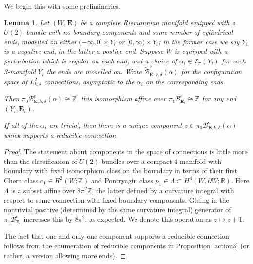 \documentclass{memo-l}
\newtheorem{lemma}[theorem]{Lemma}
\theoremstyle{definition}
\theoremstyle{remark}
\numberwithin{section}{chapter}
\numberwithin{equation}{chapter}
\begin{document}
We begin this with some preliminaries.

\begin{lemma}Let $(W,\mathbf{E})$ be a complete Riemannian manifold equipped with a $U(2)$-bundle with no boundary components and some number of cylindrical ends, modelled on either $(-\infty, 0] \times Y_i$ or $[0, \infty) \times Y_i$; in the former case we say $Y_i$ is a negative end, in the latter a postive end. Suppose $W$ is equipped with a perturbation which is regular on each end, and a choice of $\alpha_i \in \mathfrak C_\pi(Y_i)$ for each 3-manifold $Y_i$ the ends are modelled on. Write $\widetilde{\mathcal B}^e_{\mathbf{E},k,\delta}(\alpha)$ for the configuration space of $L^2_{k,\delta}$ connections, asymptotic to the $\alpha_i$ on the corresponding ends.

Then $\pi_0 \mathcal B^e_{\mathbf{E},k,\delta}(\alpha) \cong \mathbb Z$, this isomorphism affine over $\pi_1 \mathcal B^e_{\mathbf{E}_i} \cong \mathbb Z$ for any end $(Y_i, \mathbf{E}_i)$.

If all of the $\alpha_i$ are trivial, then there is a unique component $z \in \pi_0 \mathcal B^e_{\mathbf{E},k,\delta}(\alpha)$ which supports a reducible connection.
\end{lemma}

\begin{proof}The statement about components in the space of connections is little more than the classification of $U(2)$-bundles over a compact 4-manifold with boundary with fixed isomorphism class on the boundary in terms of their first Chern class $c_1 \in H^2(W;\mathbb Z)$ and Pontryagin class $p_1 \in \Lambda \subset H^4(W, \partial W; \mathbb R)$. Here $\Lambda$ is a subset affine over $8\pi^2 \mathbb Z$, the latter defined by a curvature integral with respect to some connection with fixed boundary components. Gluing in the nontrivial positive (determined by the same curvature integral) generator of $\pi_1 \mathcal B^e_{\mathbf{E}_i}$ increases this by $8\pi^2$, as expected. We denote this operation as $z \mapsto z+1$.

The fact that one and only one component supports a reducible connection follows from the enumeration of reducible components in Proposition \ref{action3} (or rather, a version allowing more ends).
\end{proof}
\end{document}
